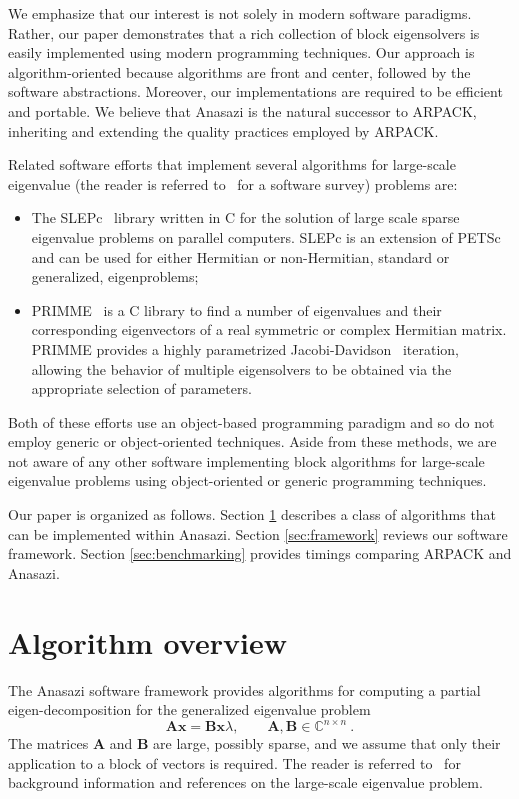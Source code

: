 \documentclass[acmtoms]{acmtrans2m}
\newcounter{algorithm}
\begin{document}
We emphasize that our interest is not solely in modern software
paradigms. Rather, our paper demonstrates that a rich collection of
block eigensolvers is easily implemented using modern programming
techniques. Our approach is algorithm-oriented \cite{muov:94}
because algorithms are front and center, followed by the software
abstractions. Moreover, our implementations are required to be
efficient and portable. We believe that Anasazi is the natural
successor to ARPACK, inheriting and extending the quality
practices employed by ARPACK.

Related software efforts that implement several algorithms for
large-scale eigenvalue (the reader is referred to~\cite{slepc:05}
for a software survey) problems are:
\begin{itemize}
\item
The SLEPc~\cite{slepc:06} library written in C for the solution of
large scale sparse eigenvalue problems on parallel computers. SLEPc
is an extension of PETSc~\cite{petsc-web-page} and can be used for
either Hermitian or non-Hermitian, standard or generalized,
eigenproblems;
\item
PRIMME~\cite{primme:06} is a C library to find a number of
eigenvalues and their corresponding eigenvectors of a real
symmetric or complex Hermitian matrix. PRIMME provides a highly
parametrized Jacobi-Davidson~\cite{slvo:96} iteration, allowing the
behavior of multiple eigensolvers to be obtained via the appropriate
selection of parameters.
\end{itemize}
Both of these efforts use an object-based programming paradigm and so
do not employ generic or object-oriented techniques. Aside from these
methods, we are not aware of any other software implementing block
algorithms for large-scale eigenvalue problems using object-oriented
or generic programming techniques.

Our paper is organized as follows. Section
\ref{sec:algorithm-overview} describes a class of algorithms that
can be implemented within Anasazi. Section \ref{sec:framework}
reviews our software framework.  Section \ref{sec:benchmarking}
provides timings comparing ARPACK and Anasazi.


\section{Algorithm overview}
\label{sec:algorithm-overview}

The Anasazi software framework provides algorithms for computing a 
partial eigen-decomposition for the generalized eigenvalue problem
\begin{equation}  \label{eq:intro.1}
  \mathbf{A} \mathbf{x} = \mathbf{B} \mathbf{x} \lambda , \qquad
  \mathbf{A}, \mathbf{B} \in \mathbb{C}^{n\times n}\ .
\end{equation}
The matrices $\mathbf{A}$ and $\mathbf{B}$ are large, possibly
sparse, and we assume that only their application to a block of
vectors is required. The reader is referred
to~\cite{saad:92,sore:02,stew:01book,vors:02} for background
information and references on the large-scale eigenvalue problem.
\end{document}
